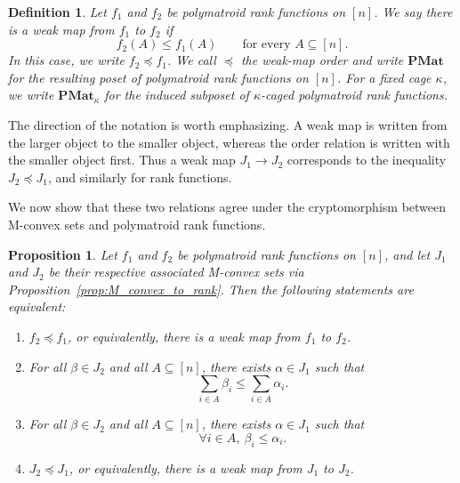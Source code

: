 \documentclass[10pt,a4paper]{amsart}
\newtheorem{proposition}[theorem]{Proposition}
\newtheorem{definition}[theorem]{Definition}
\newcommand{\PMat}{\mathbf{PMat}}      %
\newcommand{\PMatK}{\mathbf{PMat}_\kappa}
\begin{document}
\begin{definition}\label{def:weak_map_order_rank}
    Let $f_1$ and $f_2$ be polymatroid rank functions on $[n]$. We say
    there is a \emph{weak map} from $f_1$ to $f_2$ if
    \[
        f_2(A)\leq f_1(A)
        \qquad\text{for every }A\subseteq[n].
    \]
    In this case, we write $f_2\preceq f_1$. We call $\preceq$ the
    \emph{weak-map order} and write $\PMat$ for the resulting poset of
    polymatroid rank functions on $[n]$. For a fixed cage $\kappa$, we write
    $\PMatK$ for the induced subposet of $\kappa$-caged polymatroid rank
    functions.
\end{definition}

The direction of the notation is worth emphasizing. A weak map is written
from the larger object to the smaller object, whereas the order relation is
written with the smaller object first. Thus a weak map $J_1\to J_2$
corresponds to the inequality $J_2\preceq J_1$, and similarly for rank
functions.

We now show that these two relations agree under the cryptomorphism between
M-convex sets and polymatroid rank functions.

\begin{proposition}\label{prop:equivalence_of_posets}
Let $f_1$ and $f_2$ be polymatroid rank functions on $[n]$, and let $J_1$
and $J_2$ be their respective associated M-convex sets via
Proposition~\ref{prop:M_convex_to_rank}. Then the following statements are
equivalent:
\begin{enumerate}
    \item[\textup{(1)}] $f_2\preceq f_1$, or equivalently, there is a weak
    map from $f_1$ to $f_2$.

    \item[\textup{(2)}] For all $\beta \in J_2$ and all
    $A \subseteq [n]$, there exists $\alpha \in J_1$ such that
    \[
        \sum_{i \in A} \beta_i \leq \sum_{i \in A} \alpha_i.
    \]

    \item[\textup{(3)}] For all $\beta \in J_2$ and all
    $A \subseteq [n]$, there exists $\alpha \in J_1$ such that
    \[
        \forall i \in A,\ \beta_i \leq \alpha_i.
    \]

    \item[\textup{(4)}] $J_2\preceq J_1$, or equivalently, there is a weak
    map from $J_1$ to $J_2$.
\end{enumerate}
\end{proposition}
\end{document}
